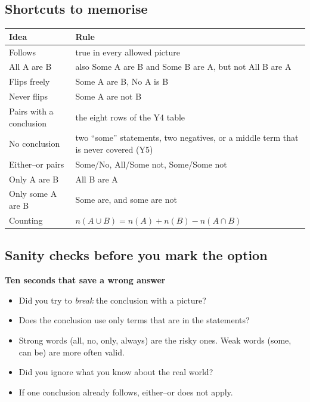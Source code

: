 \documentclass[11pt,a4paper]{article}
\let\oldsubsection\subsection
\renewcommand{\subsection}{\needspace{9\baselineskip}\oldsubsection}
\newcommand{\infobox}[2]{\par\medskip\noindent\begingroup\setlength{\fboxsep}{7pt}%
  \colorbox{codebg}{\parbox{\dimexpr\linewidth-14pt\relax}{\textbf{\color{ember}#1}\par\smallskip #2}}\endgroup\par\medskip}
\begin{document}
\subsection*{Shortcuts to memorise}
\begin{center}\small\renewcommand{\arraystretch}{1.9}\setlength{\tabcolsep}{8pt}
\begin{tabularx}{\linewidth}{@{}>{\raggedright\arraybackslash}X>{\raggedright\arraybackslash}X@{}}
\toprule
\textbf{\color{slate}Idea} & \textbf{\color{slate}Rule} \\ \midrule
Follows & true in every allowed picture \\
All A are B & also Some A are B and Some B are A, but not All B are A \\
Flips freely & Some A are B, No A is B \\
Never flips & Some A are not B \\
Pairs with a conclusion & the eight rows of the Y4 table \\
No conclusion & two ``some'' statements, two negatives, or a middle term that is never covered (Y5) \\
Either--or pairs & Some/No, All/Some not, Some/Some not \\
Only A are B & All B are A \\
Only some A are B & Some are, and some are not \\
Counting & $n(A\cup B)=n(A)+n(B)-n(A\cap B)$ \\
\bottomrule
\end{tabularx}\end{center}

\subsection*{Sanity checks before you mark the option}
\infobox{Ten seconds that save a wrong answer}{
\begin{itemize}
\item Did you try to \emph{break} the conclusion with a picture?
\item Does the conclusion use only terms that are in the statements?
\item Strong words (all, no, only, always) are the risky ones. Weak words (some, can be) are more often valid.
\item Did you ignore what you know about the real world?
\item If one conclusion already follows, either--or does not apply.
\end{itemize}}
\end{document}
